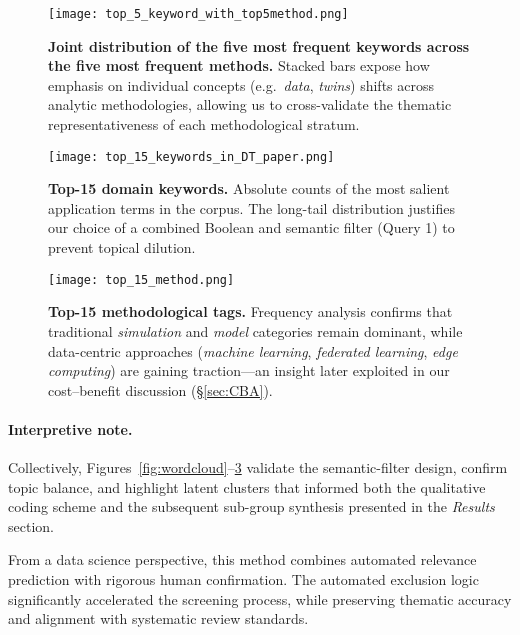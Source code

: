 \documentclass[10pt,a4paper]{article}
\begin{document}
\begin{figure}[H]
    \centering
    \texttt{[image: top\_5\_keyword\_with\_top5method.png]}
    \caption{%
        \textbf{Joint distribution of the five most frequent keywords
        across the five most frequent methods.}  
        Stacked bars expose how emphasis on individual concepts
        (e.g.\ \emph{data}, \emph{twins}) shifts across analytic
        methodologies, allowing us to cross-validate the thematic
        representativeness of each methodological stratum.}
    \label{fig:stackedbar}
\end{figure}

\begin{figure}[H]
    \centering
    \texttt{[image: top\_15\_keywords\_in\_DT\_paper.png]}
    \caption{%
        \textbf{Top-15 domain keywords.}  
        Absolute counts of the most salient application terms in the
        corpus.  The long-tail distribution justifies our choice of a
        combined Boolean and semantic filter (Query 1) to prevent
        topical dilution.}
    \label{fig:top15kw}
\end{figure}

\begin{figure}[H]
    \centering
    \texttt{[image: top\_15\_method.png]}
    \caption{%
        \textbf{Top-15 methodological tags.}  
        Frequency analysis confirms that traditional
        \emph{simulation} and \emph{model} categories remain dominant,
        while data-centric approaches (\emph{machine learning},
        \emph{federated learning}, \emph{edge computing}) are gaining
        traction—an insight later exploited in our cost–benefit
        discussion (\S\ref{sec:CBA}).}
    \label{fig:top15method}
\end{figure}

\paragraph{Interpretive note.}
Collectively, Figures~\ref{fig:wordcloud}–\ref{fig:top15method}
validate the semantic-filter design, confirm topic balance, and
highlight latent clusters that informed both the qualitative coding
scheme and the subsequent sub-group synthesis presented in the
\emph{Results} section.


\noindent From a data science perspective, this method combines automated relevance prediction with rigorous human confirmation. The automated exclusion logic significantly accelerated the screening process, while preserving thematic accuracy and alignment with systematic review standards.
\end{document}

